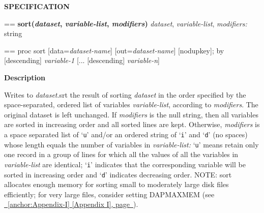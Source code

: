 \documentclass{book}
\makeatletter
\newcommand\Texinfocommandstyletextvar[1]{{\normalfont{}\textsl{#1}}}%
\newenvironment{Texinfopreformatted}{%
  \par\GNUTobeylines\obeyspaces\frenchspacing\parskip=\z@\parindent=\z@}{}
{\catcode`\^^M=13 \gdef\GNUTobeylines{\catcode`\^^M=13 \def^^M{\null\par}}}
\newenvironment{Texinfoindented}{\begin{list}{}{}\item\relax}{\end{list}}
\renewcommand{\_}{\Texinfounderscore\discretionary{}{}{}}
\makeatother
\begin{document}
\noindent{}\textbf{SPECIFICATION}
\begin{Texinfoindented}
\begin{Texinfopreformatted}%
\textbf{sort(\Texinfocommandstyletextvar{dataset}, \Texinfocommandstyletextvar{variable-list}, \Texinfocommandstyletextvar{modifiers})}
\Texinfocommandstyletextvar{dataset}, \Texinfocommandstyletextvar{variable-list}, \Texinfocommandstyletextvar{modifiers:} string
\end{Texinfopreformatted}
\end{Texinfoindented}

\begin{Texinfoindented}
\begin{Texinfopreformatted}%
proc sort [data=\Texinfocommandstyletextvar{dataset-name}] [out=\Texinfocommandstyletextvar{dataset-name}] [nodupkey];
by [descending] \Texinfocommandstyletextvar{variable-1} [... [descending] \Texinfocommandstyletextvar{variable-n}]
\end{Texinfopreformatted}
\end{Texinfoindented}

%
%

\noindent{}\textbf{Description}

Writes to \Texinfocommandstyletextvar{dataset}.srt the result of sorting
\Texinfocommandstyletextvar{dataset} in the order specified by the space-separated,
ordered list of variables \Texinfocommandstyletextvar{variable-list},
according to \Texinfocommandstyletextvar{modifiers}.
The original dataset is left unchanged.
If \Texinfocommandstyletextvar{modifiers}
is the null string, then all variables are sorted in increasing order
%
and all sorted lines are kept.
Otherwise, \Texinfocommandstyletextvar{modifiers} is a space separated list of
`\texttt{u}' and/or an ordered string of `\texttt{i}' and `\texttt{d}'
(no spaces) whose length equals the number of variables in
\Texinfocommandstyletextvar{variable-list:} `\texttt{u}' means retain only one record in a group of lines for which
all the values of all the variables in \Texinfocommandstyletextvar{variable-list} are identical;
`\texttt{i}' indicates that the corresponding variable will be sorted in increasing
order and `\texttt{d}' indicates decreasing order.
%
NOTE: sort allocates enough memory for sorting small to moderately large disk files
efficiently; for very large files, consider setting DAP\_MAXMEM (see \hyperref[anchor:Appendix-I]{\chaptername~\ref*{anchor:Appendix-I} [Appendix I], page~\pageref*{anchor:Appendix-I}}).
\end{document}

